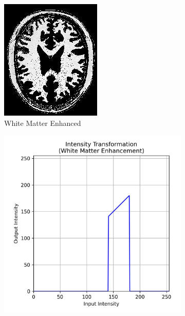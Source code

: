 \documentclass[11pt]{article}
\begin{document}
\begin{figure}[H]
    \centering
    \begin{subfigure}{0.2\textwidth}
        \includegraphics[width=\textwidth]{resources/whitematter_transformed_image.jpg}
        \caption{White Matter Enhanced}
    \end{subfigure}
    \hfill
    \begin{subfigure}{0.26\textwidth}
        \includegraphics[width=\textwidth]{resources/Whitematter_transformation_curve.jpg}

\end{subfigure}
\end{figure}
\end{document}
